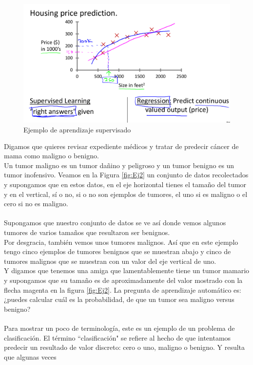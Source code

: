 \documentclass{report}
\begin{document}
\begin{figure}
	\centering
	\includegraphics[scale=0.35]{img/Ej1}
	\caption{Ejemplo de aprendizaje supervisado}
	\label{fig:Ej1}
\end{figure}
Digamos que quieres revisar
expediente médicos y tratar de predecir cáncer de mama como maligno o benigno. \\Un tumor maligno es un
tumor dañino y peligroso y un tumor benigno es un tumor inofensivo.
Veamos  en la Figura \ref{fig:Ej2} un conjunto de datos recolectados y supongamos
que en estos datos, en el eje horizontal tienes el tamaño del tumor y
en el vertical, sí o no, si o no son
ejemplos de tumores, el uno si es maligno o el cero si no es maligno.\\\\ Supongamos que nuestro conjunto de datos se ve así donde vemos algunos tumores de varios 
tamaños que resultaron ser benignos.\\
Por desgracia, también vemos unos tumores malignos. Así que en este ejemplo tengo cinco ejemplos de tumores
benignos que se muestran abajo y cinco de tumores malignos que se muestran con un
valor del eje vertical de uno.\\ Y digamos que tenemos una amiga que lamentablemente tiene un
tumor mamario y supongamos que su tamaño es de aproximadamente del valor mostrado con la flecha magenta en la figura \ref{fig:Ej2}. La
pregunta de aprendizaje automático es: ¿puedes calcular cuál es la probabilidad,
de que un tumor sea maligno versus benigno?\\\\ Para mostrar un poco
de terminología, este es un ejemplo de un problema de clasificación. El término
``clasificación" se refiere al hecho de que intentamos predecir un resultado
de valor discreto: cero o uno, maligno o benigno. Y resulta que algunas veces
\end{document}
